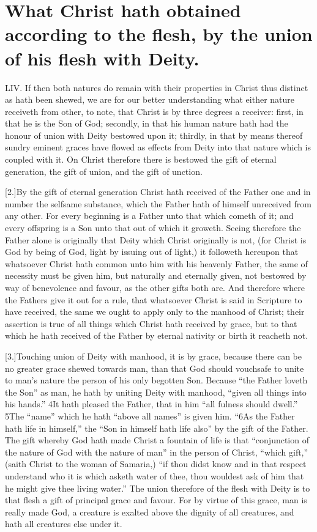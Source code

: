 \section*{What Christ hath obtained according to the flesh, by the union of his flesh with Deity.}
LIV. If then both natures do remain with their properties in Christ thus distinct as hath been shewed, we are for our better understanding what either nature receiveth from other, to note, that Christ is by three degrees a receiver: first, in that  he is the Son of God; secondly, in that his human nature hath had the honour of union with Deity bestowed upon it; thirdly, in that by means thereof sundry eminent graces have flowed as effects from Deity into that nature which is coupled with it. On Christ therefore there is bestowed the gift of eternal generation,
 the gift of union, and the gift of unction.

[2.]By the gift of eternal generation Christ hath received of the Father one and in number the selfsame substance, which the Father hath of himself unreceived from any other. For every beginning is a Father unto that which cometh of it; and every offspring is a Son unto that out of which it groweth. Seeing therefore the Father alone is originally that Deity which Christ originally is not, (for Christ is God by being of God, light by issuing out of light,) it followeth hereupon that whatsoever Christ hath common unto him with his heavenly Father, the same of necessity must be given him,  but naturally and eternally given, not bestowed by way of benevolence and favour, as the other gifts both are.
 And therefore where the Fathers give it out for a rule, that whatsoever Christ is said in Scripture to have received, the same we ought to apply only to the manhood of Christ; their assertion is true of all things which Christ hath received by grace, but to that which he hath received of the Father by eternal nativity or birth it reacheth not.

[3.]Touching union of Deity with manhood, it is by grace, because there can be no greater grace shewed towards man, than that God should vouchsafe to unite to man’s nature the person of his only begotten Son. Because “the Father loveth the Son” as man, he hath by uniting Deity with manhood, “given all things into his hands.” 4It hath pleased the Father, that in him “all fulness should dwell.” 5The “name” which he hath “above all names” is given him. “6As the Father hath life in himself,” the “Son in himself hath life also” by the gift of the Father. The gift whereby God hath made Christ a fountain of life is that “conjunction of the nature of God with the nature of man” in the person of Christ, “which gift,” (saith Christ to the woman of Samaria,) “if thou didst know and in that respect understand who it is which asketh water of thee, thou wouldest ask of him that he might give thee living water.” The union therefore of the flesh with Deity is to that flesh a gift of principal grace and favour. For by virtue of this grace, man is really made God, a creature is exalted above the dignity of all creatures, and hath all creatures else under it.




